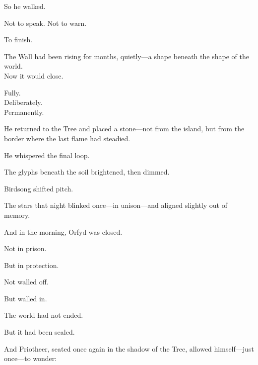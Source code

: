 \documentclass[12pt]{article}
\begin{document}
\vspace{0.5em}
So he walked.

\vspace{0.5em}
Not to speak. Not to warn.

\vspace{0.5em}
To finish.

\vspace{0.5em}
The Wall had been rising for months, quietly---a shape beneath the shape of the world.\\
Now it would close.

\vspace{0.5em}
Fully.\\
Deliberately.\\
Permanently.

\vspace{0.5em}
He returned to the Tree and placed a stone---not from the island, but from the border where the last flame had steadied.

\vspace{0.5em}
He whispered the final loop.

\vspace{0.5em}
The glyphs beneath the soil brightened, then dimmed.

\vspace{0.5em}
Birdsong shifted pitch.

\vspace{0.5em}
The stars that night blinked once---in unison---and aligned slightly out of memory.

\vspace{0.5em}
And in the morning, Orfyd was closed.

\vspace{0.5em}
Not in prison.

\vspace{0.5em}
But in protection.

\vspace{0.5em}
Not walled off.

\vspace{0.5em}
But walled in.

\vspace{0.5em}
The world had not ended.

\vspace{0.5em}
But it had been sealed.

\vspace{0.5em}
And Priotheer, seated once again in the shadow of the Tree, allowed himself---just once---to wonder:
\end{document}
